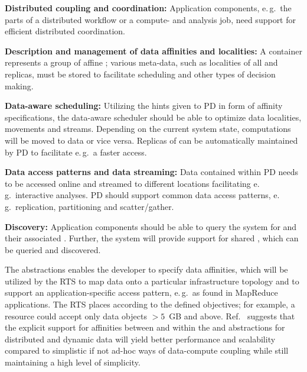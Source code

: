 \documentclass[conference]{IEEEtran}
\begin{document}
\begin{compactitem}
\item \textbf{Distributed coupling and coordination:} Application
  components, e.\,g.\ the parts of a distributed workflow or a
  compute- and analysis job, need support for efficient distributed
  coordination.
\item \textbf{Description and management of data affinities and
    localities:} A \pd container represents a group of affine
  \dataunits; %
  various meta-data, such as localities of all \dataunits and
  replicas, must be stored to facilitate scheduling and other types of
  decision making.
\item \textbf{Data-aware scheduling:} Utilizing the hints given to PD
  in form of affinity specifications, the data-aware scheduler should
  be able to optimize data localities, movements and
  streams. Depending on the current system state, computations will be
  moved to data or vice versa. Replicas of \dataunits can be
  automatically maintained by PD to facilitate e.\,g.\ a faster
  access.
\item \textbf{Data access patterns and data streaming:} Data contained
  within PD needs to be accessed online and streamed to different
  locations facilitating e.\,g.\ interactive analyses.  PD should
  support common data access patterns, e.\,g.\ replication,
  partitioning and scatter/gather.
\item \textbf{Discovery:} Application components should be able to
  query the system for \dataunits and their associated
  \pilots. Further, the system will provide support for shared \dus,
  which can be queried and discovered.
\end{compactitem}

The abstractions enables the
developer to specify data affinities, which will be utilized by the RTS to
map data onto a particular infrastructure topology and to support an
application-specific access pattern, e.\,g.\ as found in MapReduce
applications. The RTS places \dataunits according to the defined
objectives; for example, a resource could accept only data objects
$>5$~GB and above.  Ref.~\cite{ddia_ptrsa10} suggests that the
explicit support for affinities between and within the \pj and \pd
abstractions for distributed and dynamic data will yield better
performance and scalability compared to simplistic if not ad-hoc ways
of data-compute coupling while still maintaining a high level of
simplicity.
\end{document}
